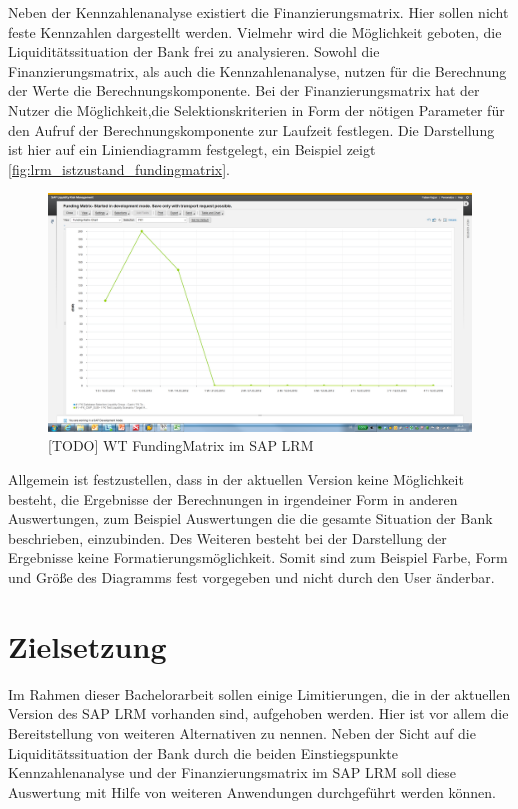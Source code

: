 Neben der Kennzahlenanalyse existiert die Finanzierungsmatrix. Hier sollen nicht feste Kennzahlen dargestellt werden. Vielmehr wird  die Möglichkeit geboten, die Liquiditätssituation der Bank frei zu analysieren. Sowohl die Finanzierungsmatrix, als auch die Kennzahlenanalyse, nutzen für die Berechnung der Werte die Berechnungskomponente. Bei der Finanzierungsmatrix hat der Nutzer die Möglichkeit,die Selektionskriterien in Form der nötigen Parameter für den Aufruf der Berechnungskomponente zur Laufzeit festlegen. Die Darstellung ist hier auf ein Liniendiagramm festgelegt, ein Beispiel zeigt  \vref{fig:lrm_istzustand_fundingmatrix}.

\begin{figure}[h]
\centering
\setlength{\unitlength}{1mm}
\includegraphics[width=15cm]{images/Funding_Matrix_Example.png}
\caption{[TODO] WT FundingMatrix im SAP LRM\label{fig:lrm_istzustand_fundingmatrix}}
\end{figure}

Allgemein ist festzustellen, dass in der aktuellen Version keine Möglichkeit besteht, die Ergebnisse der Berechnungen in irgendeiner Form in anderen Auswertungen, zum Beispiel Auswertungen die die gesamte Situation der Bank beschrieben, einzubinden. Des Weiteren besteht bei der Darstellung der Ergebnisse keine Formatierungsmöglichkeit. Somit sind zum Beispiel Farbe, Form und Größe des Diagramms fest vorgegeben und nicht durch den User änderbar.

\section{Zielsetzung} \label{sec:zielsetzung}

Im Rahmen dieser Bachelorarbeit sollen einige Limitierungen, die in der aktuellen Version des SAP LRM vorhanden sind, aufgehoben werden. Hier ist vor allem die Bereitstellung von weiteren Alternativen zu nennen. Neben der Sicht auf die Liquiditätssituation der Bank durch die beiden Einstiegspunkte Kennzahlenanalyse und der Finanzierungsmatrix im SAP LRM soll diese Auswertung mit Hilfe von weiteren Anwendungen durchgeführt werden können.

